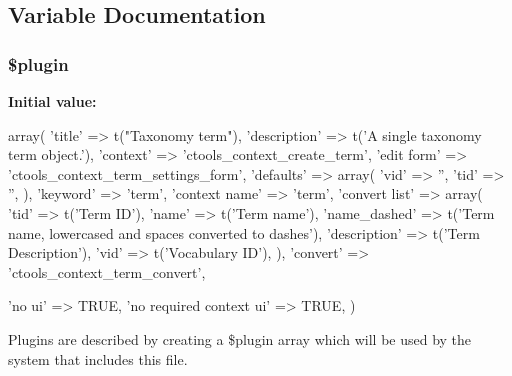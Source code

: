 \subsection{Variable Documentation}
\hypertarget{contexts_2term_8inc_ada8a7130088351710bb02ed622d6bf65}{
\subsubsection[{\$plugin}]{\setlength{\rightskip}{0pt plus 5cm}\$plugin}}
\label{contexts_2term_8inc_ada8a7130088351710bb02ed622d6bf65}
{\bfseries Initial value:}
\begin{DoxyCode}
 array(
  'title' => t("Taxonomy term"),
  'description' => t('A single taxonomy term object.'),
  'context' => 'ctools_context_create_term',
  'edit form' => 'ctools_context_term_settings_form',
  'defaults' => array(
    'vid' => '',
    'tid' => '',
  ),
  'keyword' => 'term',
  'context name' => 'term',
  'convert list' => array(
    'tid' => t('Term ID'),
    'name' => t('Term name'),
    'name_dashed' => t('Term name, lowercased and spaces converted to dashes'),
    'description' => t('Term Description'),
    'vid' => t('Vocabulary ID'),
  ),
  'convert' => 'ctools_context_term_convert',
  
  'no ui' => TRUE,
  'no required context ui' => TRUE,
)
\end{DoxyCode}
Plugins are described by creating a \$plugin array which will be used by the system that includes this file. 